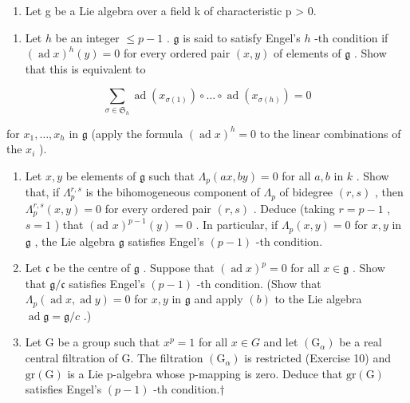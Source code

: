 \begin{enumerate}
\def\labelenumi{\arabic{enumi}.}
\setcounter{enumi}{11}
\tightlist
\item
  Let g be a Lie algebra over a field k of characteristic p \textgreater{} 0.
\end{enumerate}

\begin{enumerate}
\def\labelenumi{(\alph{enumi})}
\tightlist
\item
  Let \(h\) be an integer \(\leqslant p - 1\) . \(\mathfrak{g}\) is said to satisfy Engel's \(h\) -th condition if \((\operatorname{ad} x)^h(y) = 0\) for every ordered pair \((x, y)\) of elements of \(\mathfrak{g}\) . Show that this is equivalent to
\end{enumerate}

\[
\sum_ {\sigma \in \mathfrak {S} _ {h}} \operatorname{ad} (x _ {\sigma (1)}) \circ \dots \circ \operatorname{ad} (x _ {\sigma (h)}) = 0
\]

for \(x_1, \ldots, x_h\) in \(\mathfrak{g}\) (apply the formula \((\operatorname{ad} x)^h = 0\) to the linear combinations of the \(x_i\) ).


\begin{enumerate}
\def\labelenumi{(\alph{enumi})}
\setcounter{enumi}{1}
\item
  Let \(x, y\) be elements of \(\mathfrak{g}\) such that \(\Lambda_p(ax, by) = 0\) for all \(a, b\) in \(k\) . Show that, if \(\Lambda_p^{r,s}\) is the bihomogeneous component of \(\Lambda_p\) of bidegree \((r, s)\) , then \(\Lambda_p^{r,s}(x, y) = 0\) for every ordered pair \((r, s)\) . Deduce (taking \(r = p - 1\) , \(s = 1\) ) that \((\text{ad } x)^{p-1}(y) = 0\) . In particular, if \(\Lambda_p(x, y) = 0\) for \(x, y\) in \(\mathfrak{g}\) , the Lie algebra \(\mathfrak{g}\) satisfies Engel's \((p - 1)\) -th condition.
\item
  Let \(\mathfrak{c}\) be the centre of \(\mathfrak{g}\) . Suppose that \((\operatorname{ad} x)^p = 0\) for all \(x \in \mathfrak{g}\) . Show that \(\mathfrak{g} / \mathfrak{c}\) satisfies Engel's \((p - 1)\) -th condition. (Show that \(\Lambda_p(\operatorname{ad} x, \operatorname{ad} y) = 0\) for \(x, y\) in \(\mathfrak{g}\) and apply \((b)\) to the Lie algebra \(\operatorname{ad} \mathfrak{g} = \mathfrak{g} / c\) .)
\item
  Let G be a group such that \(x^{p}=1\) for all \(x\in G\) and let \((\mathrm{G}_{\alpha})\) be a real central filtration of G. The filtration \((\mathrm{G}_{\alpha})\) is restricted (Exercise 10) and \(\mathrm{gr}(\mathrm{G})\) is a Lie p-algebra whose p-mapping is zero. Deduce that \(\mathrm{gr}(\mathrm{G})\) satisfies Engel's \((p-1)\) -th condition.†
\end{enumerate}

